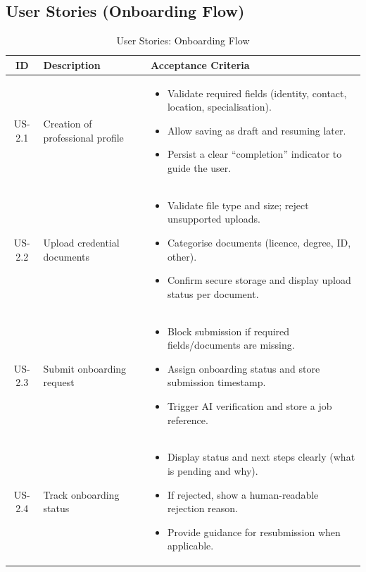 \subsection{User Stories (Onboarding Flow)}
\begin{table}[H]
\centering
\begin{tabularx}{\textwidth}{|c|X|X|}
\hline
\rowcolor{medgray}
\textbf{ID} & \textbf{Description} & \textbf{Acceptance Criteria} \\
\hline

US-2.1 & Creation of professional profile &
\begin{itemize}[leftmargin=*]
\item Validate required fields (identity, contact, location, specialisation).
\item Allow saving as draft and resuming later.
\item Persist a clear ``completion'' indicator to guide the user.
\end{itemize} \\ \hline

US-2.2 & Upload credential documents &
\begin{itemize}[leftmargin=*]
\item Validate file type and size; reject unsupported uploads.
\item Categorise documents (licence, degree, ID, other).
\item Confirm secure storage and display upload status per document.
\end{itemize} \\ \hline

US-2.3 & Submit onboarding request &
\begin{itemize}[leftmargin=*]
\item Block submission if required fields/documents are missing.
\item Assign onboarding status and store submission timestamp.
\item Trigger AI verification and store a job reference.
\end{itemize} \\ \hline

US-2.4 & Track onboarding status &
\begin{itemize}[leftmargin=*]
\item Display status and next steps clearly (what is pending and why).
\item If rejected, show a human-readable rejection reason.
\item Provide guidance for resubmission when applicable.
\end{itemize} \\ \hline

\end{tabularx}
\caption{User Stories: Onboarding Flow}
\end{table}

